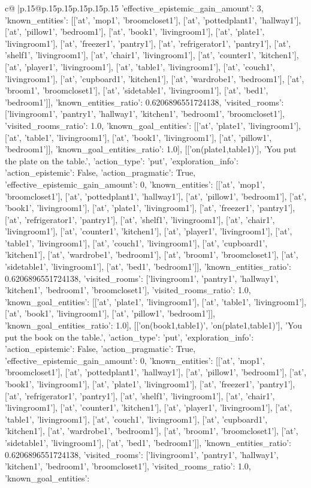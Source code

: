 \documentclass{article}
\begin{document}
{\begin{supertabular}{c@{$\;$}|p{.15\linewidth}@{}p{.15\linewidth}p{.15\linewidth}p{.15\linewidth}p{.15\linewidth}p{.15\linewidth}}
{{{'effective_epistemic_gain_amount': 3, 'known_entities': [['at', 'mop1', 'broomcloset1'], ['at', 'pottedplant1', 'hallway1'], ['at', 'pillow1', 'bedroom1'], ['at', 'book1', 'livingroom1'], ['at', 'plate1', 'livingroom1'], ['at', 'freezer1', 'pantry1'], ['at', 'refrigerator1', 'pantry1'], ['at', 'shelf1', 'livingroom1'], ['at', 'chair1', 'livingroom1'], ['at', 'counter1', 'kitchen1'], ['at', 'player1', 'livingroom1'], ['at', 'table1', 'livingroom1'], ['at', 'couch1', 'livingroom1'], ['at', 'cupboard1', 'kitchen1'], ['at', 'wardrobe1', 'bedroom1'], ['at', 'broom1', 'broomcloset1'], ['at', 'sidetable1', 'livingroom1'], ['at', 'bed1', 'bedroom1']], 'known_entities_ratio': 0.6206896551724138, 'visited_rooms': ['livingroom1', 'pantry1', 'hallway1', 'kitchen1', 'bedroom1', 'broomcloset1'], 'visited_rooms_ratio': 1.0, 'known_goal_entities': [['at', 'plate1', 'livingroom1'], ['at', 'table1', 'livingroom1'], ['at', 'book1', 'livingroom1'], ['at', 'pillow1', 'bedroom1']], 'known_goal_entities_ratio': 1.0}}], [['on(plate1,table1)'], 'You put the plate on the table.', {'action_type': 'put', 'exploration_info': {'action_epistemic': False, 'action_pragmatic': True, 'effective_epistemic_gain_amount': 0, 'known_entities': [['at', 'mop1', 'broomcloset1'], ['at', 'pottedplant1', 'hallway1'], ['at', 'pillow1', 'bedroom1'], ['at', 'book1', 'livingroom1'], ['at', 'plate1', 'livingroom1'], ['at', 'freezer1', 'pantry1'], ['at', 'refrigerator1', 'pantry1'], ['at', 'shelf1', 'livingroom1'], ['at', 'chair1', 'livingroom1'], ['at', 'counter1', 'kitchen1'], ['at', 'player1', 'livingroom1'], ['at', 'table1', 'livingroom1'], ['at', 'couch1', 'livingroom1'], ['at', 'cupboard1', 'kitchen1'], ['at', 'wardrobe1', 'bedroom1'], ['at', 'broom1', 'broomcloset1'], ['at', 'sidetable1', 'livingroom1'], ['at', 'bed1', 'bedroom1']], 'known_entities_ratio': 0.6206896551724138, 'visited_rooms': ['livingroom1', 'pantry1', 'hallway1', 'kitchen1', 'bedroom1', 'broomcloset1'], 'visited_rooms_ratio': 1.0, 'known_goal_entities': [['at', 'plate1', 'livingroom1'], ['at', 'table1', 'livingroom1'], ['at', 'book1', 'livingroom1'], ['at', 'pillow1', 'bedroom1']], 'known_goal_entities_ratio': 1.0}}], [['on(book1,table1)', 'on(plate1,table1)'], 'You put the book on the table.', {'action_type': 'put', 'exploration_info': {'action_epistemic': False, 'action_pragmatic': True, 'effective_epistemic_gain_amount': 0, 'known_entities': [['at', 'mop1', 'broomcloset1'], ['at', 'pottedplant1', 'hallway1'], ['at', 'pillow1', 'bedroom1'], ['at', 'book1', 'livingroom1'], ['at', 'plate1', 'livingroom1'], ['at', 'freezer1', 'pantry1'], ['at', 'refrigerator1', 'pantry1'], ['at', 'shelf1', 'livingroom1'], ['at', 'chair1', 'livingroom1'], ['at', 'counter1', 'kitchen1'], ['at', 'player1', 'livingroom1'], ['at', 'table1', 'livingroom1'], ['at', 'couch1', 'livingroom1'], ['at', 'cupboard1', 'kitchen1'], ['at', 'wardrobe1', 'bedroom1'], ['at', 'broom1', 'broomcloset1'], ['at', 'sidetable1', 'livingroom1'], ['at', 'bed1', 'bedroom1']], 'known_entities_ratio': 0.6206896551724138, 'visited_rooms': ['livingroom1', 'pantry1', 'hallway1', 'kitchen1', 'bedroom1', 'broomcloset1'], 'visited_rooms_ratio': 1.0, 'known_goal_entities': }}}
\end{supertabular}}
\end{document}

